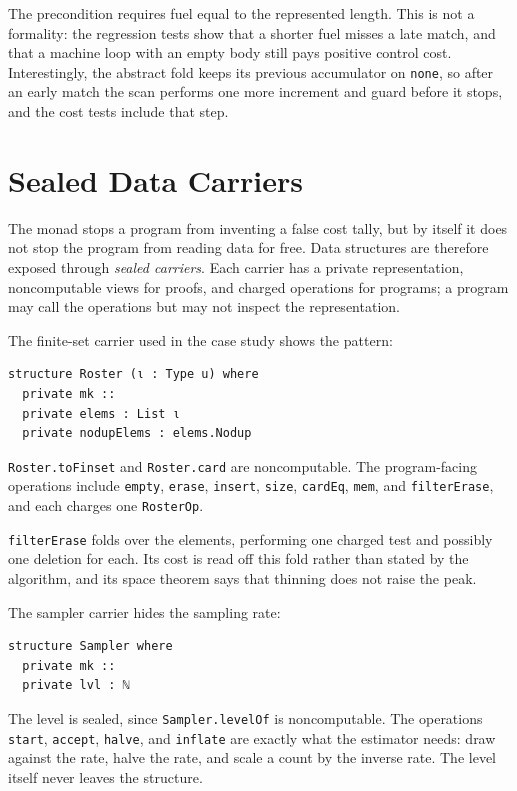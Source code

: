 \documentclass[acmsmall,nonacm]{acmart}
\begin{document}
The precondition requires fuel equal to the represented length.
This is not a formality: the regression tests show that a shorter fuel misses a late match, and that a machine loop with an empty body still pays positive control cost.
Interestingly, the abstract fold keeps its previous accumulator on \lstinline{none}, so after an early match the scan performs one more increment and guard before it stops, and the cost tests include that step.


\section{Sealed Data Carriers}\label{sec:carriers}

The monad stops a program from inventing a false cost tally, but by itself it does not stop the program from reading data for free.
Data structures are therefore exposed through \emph{sealed carriers}.
Each carrier has a private representation, noncomputable views for proofs, and charged operations for programs; a program may call the operations but may not inspect the representation.

The finite-set carrier used in the case study shows the pattern:

\begin{lstlisting}
structure Roster (ι : Type u) where
  private mk ::
  private elems : List ι
  private nodupElems : elems.Nodup
\end{lstlisting}

\lstinline{Roster.toFinset} and \lstinline{Roster.card} are noncomputable.
The program-facing operations include \lstinline{empty}, \lstinline{erase}, \lstinline{insert}, \lstinline{size}, \lstinline{cardEq}, \lstinline{mem}, and \lstinline{filterErase}, and each charges one \lstinline{RosterOp}.

\lstinline{filterErase} folds over the elements, performing one charged test and possibly one deletion for each.
Its cost is read off this fold rather than stated by the algorithm, and its space theorem says that thinning does not raise the peak.

The sampler carrier hides the sampling rate:

\begin{lstlisting}
structure Sampler where
  private mk ::
  private lvl : ℕ
\end{lstlisting}

The level is sealed, since \lstinline{Sampler.levelOf} is noncomputable.
The operations \lstinline{start}, \lstinline{accept}, \lstinline{halve}, and \lstinline{inflate} are exactly what the estimator needs: draw against the rate, halve the rate, and scale a count by the inverse rate.
The level itself never leaves the structure.
\end{document}
